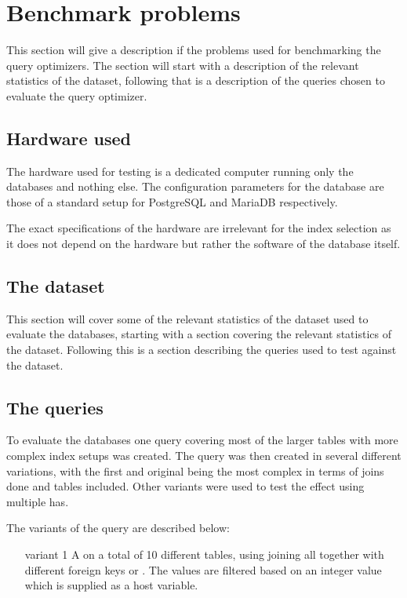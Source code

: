 \section{Benchmark problems}\label{sec:benchmark}
This section will give a description if the problems used for benchmarking the
query optimizers. The section will start with a description of the relevant
statistics of the dataset, following that is a description of the queries
chosen to evaluate the query optimizer.

\subsection{Hardware used}
The hardware used for testing is a dedicated computer running only the databases
and nothing else. The configuration parameters for the database are those of a
standard setup for PostgreSQL and MariaDB respectively.

The exact specifications of the hardware are irrelevant for the index selection
as it does not depend on the hardware but rather the software of the database itself.

\subsection{The dataset}
This section will cover some of the relevant statistics of the dataset used to
evaluate the databases, starting with a section covering the relevant statistics
of the dataset. Following this is a section describing the queries used to test
against the dataset.

\subsection{The queries}\label{sec:queries}
To evaluate the databases one query covering most of the larger tables with more
complex index setups was created. The query was then created in several
different variations, with the first and original being the most complex in
terms of joins done and tables included. Other variants were used to test the
effect using multiple  has.

The variants of the query are described below:
\begin{enumerate}
\item [variant 1] A  on a total of 10 different tables, using
  joining all together with different foreign keys  or
  . The values are filtered based on an integer
  value which is supplied as a host variable.
\end{enumerate}

